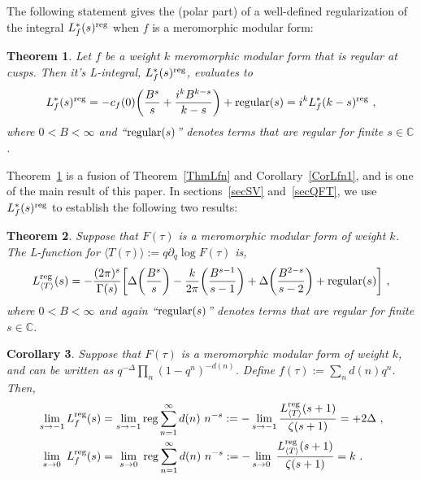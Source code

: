 \documentclass[11pt,a4paper]{article}
\newcommand{\G}{\Gamma}
\newtheorem{thm}{Theorem}[section]
\newtheorem{cor}[thm]{Corollary}
\def\C{\mathbb{C}}
\newcommand{\reg}{{\rm reg}}
\begin{document}
The following statement gives the (polar part) of a well-defined regularization of the integral $L_f^*(s)^\reg$ when $f$ is a meromorphic modular form:

\begin{thm}\label{Thm1}
Let $f$ be a weight $k$ meromorphic modular form that is regular at cusps. Then it's L-integral, $L_f^*(s)^\reg$, evaluates to
\begin{align} 
L_f^*(s)^\reg=-c_f(0) \bigg(\frac{B^s}{s} +\frac{i^k B^{k-s}}{k-s} \bigg) + {\rm regular}(s) = i^k L_f^*(k-s)^\reg~,
\label{eqThm1}
\end{align}
where $0< B < \infty$ and ``${\rm regular}(s)$'' denotes terms that are regular for finite $s \in \C$. 
\end{thm}
\noindent Theorem~\ref{Thm1} is a fusion of Theorem~\ref{ThmLfn} and Corollary~\ref{CorLfn1}, and is one of the main result of this paper. In sections~\ref{secSV} and~\ref{secQFT}, we use $L_f^*(s)^\reg$ to establish the following two results:

\begin{thm}\label{Thm2}
Suppose that $F(\tau)$ is a meromorphic modular form of weight $k$. The L-function for $\langle T(\tau) \rangle := q \partial_q \log F(\tau)$ is,
\begin{align}
L_{\langle T \rangle}^\reg(s) = -\frac{(2 \pi)^s}{\G(s)} \bigg[ 
\Delta\bigg( \frac{B^s}{s}\bigg) - 
\frac{k}{2 \pi} \bigg(\frac{B^{s-1}}{s-1}\bigg) + 
\Delta\bigg(\frac{B^{2-s}}{s-2}\bigg) 
+ {\rm regular}(s) \bigg]~,
\label{eqThm2}
\end{align}
where $0 < B < \infty$ and again ``${\rm regular}(s)$'' denotes terms that are regular for finite $s \in \C$.
\end{thm}

\begin{cor}\label{Cor1}
Suppose that $F(\tau)$ is a meromorphic modular form of weight $k$, and can be written as $q^{-\Delta} \prod_n (1-q^n)^{-d(n)}$. Define $f(\tau):=\sum_n d(n) q^n$. Then,
\begin{align}
\begin{split}
\lim_{s \to -1} L_{f}^\reg(s) 
&= \lim_{s \to -1} \reg \sum_{n = 1}^{\infty} d(n)~n^{-s} 
:= -\lim_{s \to -1} \frac{L_{\langle T \rangle}^{\reg}(s+1)}{\zeta(s+1)}
= +2 \Delta~,  \\
\lim_{~s \to 0~} L_{f}^\reg(s) 
&= \lim_{~s \to 0~} \reg \sum_{n = 1}^{\infty} d(n)~n^{-s} 
:= -\lim_{s \to 0~} \frac{L_{\langle T \rangle}^{\reg}(s+1)}{\zeta(s+1)}
= k ~. \label{eqCor1}
\end{split}
\end{align}
\end{cor}
\end{document}
